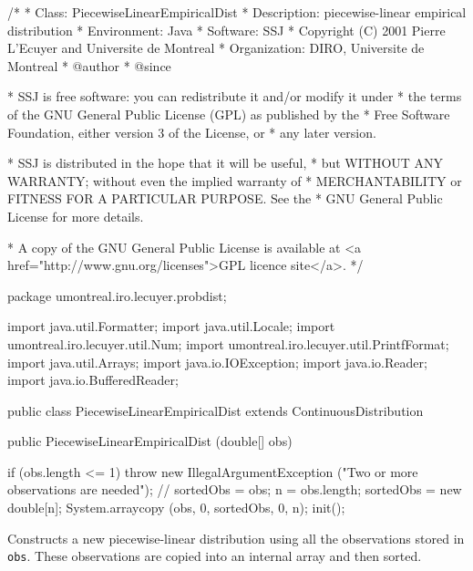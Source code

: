 \begin{code}
\begin{hide}
/*
 * Class:        PiecewiseLinearEmpiricalDist
 * Description:  piecewise-linear empirical distribution
 * Environment:  Java
 * Software:     SSJ 
 * Copyright (C) 2001  Pierre L'Ecuyer and Universite de Montreal
 * Organization: DIRO, Universite de Montreal
 * @author       
 * @since

 * SSJ is free software: you can redistribute it and/or modify it under
 * the terms of the GNU General Public License (GPL) as published by the
 * Free Software Foundation, either version 3 of the License, or
 * any later version.

 * SSJ is distributed in the hope that it will be useful,
 * but WITHOUT ANY WARRANTY; without even the implied warranty of
 * MERCHANTABILITY or FITNESS FOR A PARTICULAR PURPOSE.  See the
 * GNU General Public License for more details.

 * A copy of the GNU General Public License is available at
   <a href="http://www.gnu.org/licenses">GPL licence site</a>.
 */
\end{hide}
package umontreal.iro.lecuyer.probdist;\begin{hide}

import java.util.Formatter;
import java.util.Locale;
import umontreal.iro.lecuyer.util.Num;
import umontreal.iro.lecuyer.util.PrintfFormat;
import java.util.Arrays;
import java.io.IOException;
import java.io.Reader;
import java.io.BufferedReader;
\end{hide}

public class PiecewiseLinearEmpiricalDist extends ContinuousDistribution\begin{hide} {
   private double[] sortedObs;
   private double[] diffObs;
   private int n = 0;
   private double sampleMean;
   private double sampleVariance;
   private double sampleStandardDeviation;
\end{hide}

   public PiecewiseLinearEmpiricalDist (double[] obs)\begin{hide} {
      if (obs.length <= 1)
         throw new IllegalArgumentException ("Two or more observations are needed");
      // sortedObs = obs;
      n = obs.length;
      sortedObs = new double[n];
      System.arraycopy (obs, 0, sortedObs, 0, n);
      init();
   }\end{hide}
\end{code}
\begin{tabb} 
  Constructs a new piecewise-linear distribution using
  all the observations stored in \texttt{obs}.
  These observations are copied into an internal array and then sorted.
\end{tabb}
